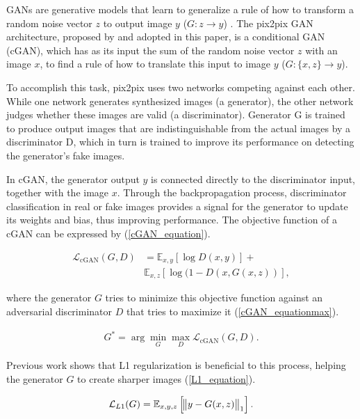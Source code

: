 \documentclass[conference]{IEEEtran}
\begin{document}
GANs are generative models that learn to generalize a rule of how to transform a random noise vector $z$ to output image $y$ ($G: z\rightarrow y$) \cite{Goodfellow2014GenerativeAN}. The pix2pix GAN architecture, proposed by \cite{isola2018imagetoimage} and adopted in this paper, is a conditional GAN (cGAN), which has as its input the sum of the random noise vector $z$ with an image $x$, to find a rule of how to translate this input to image $y$ ($G: \{x,z\}\rightarrow y$).

To accomplish this task, pix2pix uses two networks competing against each other. While one network generates synthesized images (a generator), the other network judges whether these images are valid (a discriminator). Generator G is trained to produce output images that are indistinguishable from the actual images by a discriminator D, which in turn is trained to improve its performance on detecting the generator’s fake images.

In cGAN, the generator output $y$ is connected directly to the discriminator input, together with the image $x$. 
Through the backpropagation process, discriminator classification in real or fake images provides a signal for the generator to update its weights and bias, thus improving performance.
The objective function of a cGAN can be expressed by (\ref{cGAN_equation}).  

\begin{align}
    \mathcal{L}_{\mathrm{cGAN}}(G,D) &= \mathbb{E}_{x,y}\left[\log D(x,y)\right] + \nonumber \\
                 & \mathbb{E}_{x,z}\left[\log (1-D(x,G(x,z))\right],\label{cGAN_equation}
\end{align}

where the generator $G$ tries to minimize this objective function against an adversarial discriminator $D$ that tries to maximize it (\ref{cGAN_equationmax}). 

\begin{align}
     G^*  = \arg\min_G\max_D \mathcal{L}_{\mathrm{cGAN}}(G,D).\label{cGAN_equationmax}
\end{align}

Previous work \cite{Pathak2016ContextEF} shows that L1 regularization is beneficial to this process, helping the generator $G$ to create sharper images (\ref{L1_equation}).

\begin{align}
    \mathcal{L}_{L1}(G) = \mathbb{E}_{x,y,z}\left[\norm{y-G(x,z)}_1\right].\label{L1_equation}
\end{align}
\end{document}
